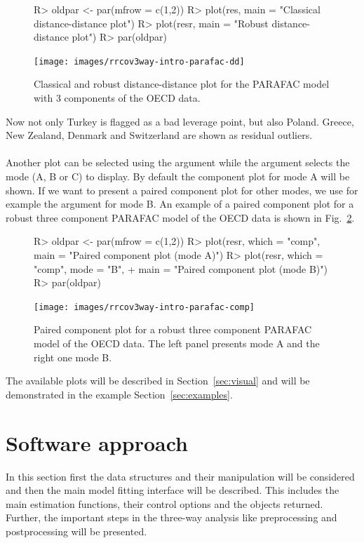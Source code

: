 \documentclass[article,shortnames, nojss]{jss}
\begin{document}
\begin{figure}[H]
\centering
\begin{Schunk}
\begin{Sinput}
R> oldpar <- par(mfrow = c(1,2))
R> plot(res, main = "Classical distance-distance plot")
R> plot(resr, main = "Robust distance-distance plot")
R> par(oldpar)
\end{Sinput}
\end{Schunk}
\texttt{[image: images/rrcov3way-intro-parafac-dd]}
\caption{Classical and robust distance-distance plot for the PARAFAC model with 3 components of the OECD data.}
\label{fig:intro-dd}
\end{figure}
Now not only Turkey is flagged as a bad leverage point, but also Poland.
Greece, New Zealand, Denmark and Switzerland are shown as residual outliers.\\\\
Another plot can be selected using the argument  while
the argument  selects the mode (A, B or C) to display.
By default the component plot for mode A will be shown. If we want to present a
paired component plot for other modes, we use for example
the argument  for mode B. An example of a paired component
plot for a robust three component PARAFAC model of the OECD data is shown
in Fig.~\ref{fig:intro-comp}.
\begin{figure}[H]
\centering
\begin{Schunk}
\begin{Sinput}
R> oldpar <- par(mfrow = c(1,2))
R> plot(resr, which = "comp", main = "Paired component plot (mode A)")
R> plot(resr, which = "comp", mode = "B",
+      main = "Paired component plot (mode B)")
R> par(oldpar)
\end{Sinput}
\end{Schunk}
\texttt{[image: images/rrcov3way-intro-parafac-comp]}
\caption{Paired component plot for a robust three component PARAFAC model of the OECD data.
The left panel presents mode A and the right one mode B.}
\label{fig:intro-comp}
\end{figure}

The available plots will be described in
Section~\ref{sec:visual} and will be demonstrated in the example
Section~\ref{sec:examples}.

\section{Software approach}
\label{sec:software}
In this section first the data structures and their manipulation
will be considered and then the main model fitting interface
will be described. This includes the main estimation functions,
their control options and the objects returned. Further, the
important steps in the three-way analysis like preprocessing
and postprocessing will be presented.
\end{document}
